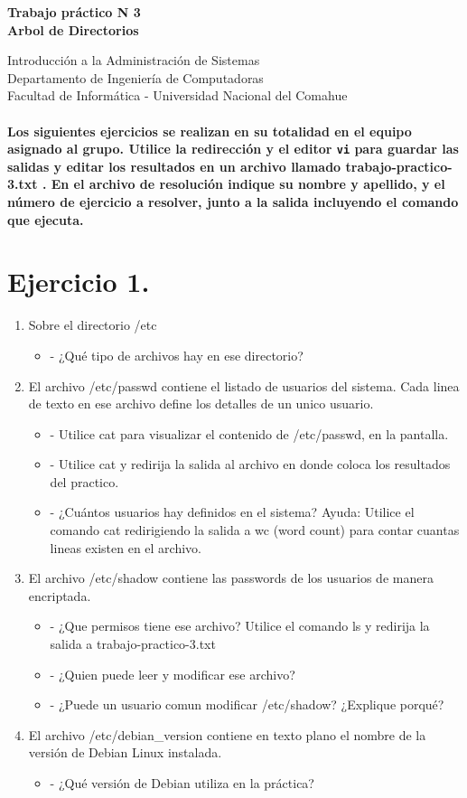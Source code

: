 \documentclass[12pt]{article}
\def\maketitle{

 \makeatletter
 {\color{bl} \centering \huge \sc \textbf{
Trabajo práctico N 3 \\
\large \vspace*{-8pt} \color{black} Arbol de Directorios
 \vspace*{8pt} }\par}
 \makeatother


 \makeatletter
 {\centering \small 
	Introducción a la Administración de Sistemas \\
 	Departamento de Ingeniería de Computadoras \\
 	Facultad de Informática - Universidad Nacional del Comahue \\
 	\vspace{20pt} }
 \makeatother

}
\begin{document}
\thispagestyle{empty}
\maketitle
\setlength{\parindent}{0pt}

\paragraph{Los siguientes ejercicios se realizan en su totalidad en el equipo asignado al grupo.
Utilice la redirección y el editor \texttt{vi} para guardar las salidas y editar los resultados 
en un archivo llamado trabajo-practico-3.txt . En el archivo de resolución indique su nombre y apellido, y el número de ejercicio a resolver, junto a la salida incluyendo el comando que ejecuta. }

\section{Ejercicio 1.}

\begin{enumerate}
\item Sobre el directorio /etc
\begin{itemize}
\item - ¿Qué tipo de archivos hay en ese directorio?
\end{itemize}

\item El archivo /etc/passwd contiene el listado de usuarios del sistema.
Cada linea de texto en ese archivo define los detalles de un unico usuario.

\begin{itemize}
\item - Utilice cat para visualizar el contenido de /etc/passwd, en la pantalla.
\item - Utilice cat y redirija la salida al archivo en donde coloca los resultados del practico.
\item - ¿Cuántos usuarios hay definidos en el sistema?
Ayuda: Utilice el comando cat redirigiendo la salida a wc (word count) para contar cuantas lineas
existen en el archivo.
\end{itemize}


\item El archivo /etc/shadow contiene las passwords de los usuarios de manera encriptada.
\begin{itemize}
\item - ¿Que permisos tiene ese archivo? Utilice el comando ls y redirija la salida a trabajo-practico-3.txt
\item - ¿Quien puede leer y modificar ese archivo?
\item - ¿Puede un usuario comun modificar /etc/shadow? ¿Explique porqué?
\end{itemize}


\item El archivo /etc/debian\_version contiene en texto plano el nombre de la
versión de Debian Linux instalada.
\begin{itemize}
\item - ¿Qué versión de Debian utiliza en la práctica?
\end{itemize}
\end{enumerate}
\end{document}
